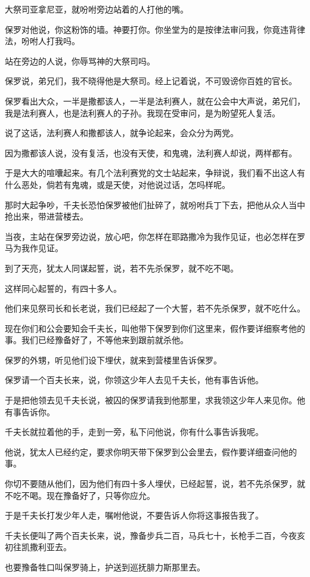\documentclass[12pt,oneside]{book}
\begin{document}
大祭司亚拿尼亚，就吩咐旁边站着的人打他的嘴。

保罗对他说，你这粉饰的墙。神要打你。你坐堂为的是按律法审问我，你竟违背律法，吩咐人打我吗。

站在旁边的人说，你辱骂神的大祭司吗。

保罗说，弟兄们，我不晓得他是大祭司。经上记着说，不可毁谤你百姓的官长。

保罗看出大众，一半是撒都该人，一半是法利赛人，就在公会中大声说，弟兄们，我是法利赛人，也是法利赛人的子孙。我现在受审问，是为盼望死人复活。

说了这话，法利赛人和撒都该人，就争论起来，会众分为两党。

因为撒都该人说，没有复活，也没有天使，和鬼魂，法利赛人却说，两样都有。

于是大大的喧囔起来。有几个法利赛党的文士站起来，争辩说，我们看不出这人有什么恶处，倘若有鬼魂，或是天使，对他说过话，怎吗样呢。

那时大起争吵，千夫长恐怕保罗被他们扯碎了，就吩咐兵丁下去，把他从众人当中抢出来，带进营楼去。

当夜，主站在保罗旁边说，放心吧，你怎样在耶路撒冷为我作见证，也必怎样在罗马为我作见证。

到了天亮，犹太人同谋起誓，说，若不先杀保罗，就不吃不喝。

这样同心起誓的，有四十多人。

他们来见祭司长和长老说，我们已经起了一个大誓，若不先杀保罗，就不吃什么。

现在你们和公会要知会千夫长，叫他带下保罗到你们这里来，假作要详细察考他的事。我们已经豫备好了，不等他来到跟前就杀他。

保罗的外甥，听见他们设下埋伏，就来到营楼里告诉保罗。

保罗请一个百夫长来，说，你领这少年人去见千夫长，他有事告诉他。

于是把他领去见千夫长说，被囚的保罗请我到他那里，求我领这少年人来见你。他有事告诉你。

千夫长就拉着他的手，走到一旁，私下问他说，你有什么事告诉我呢。

他说，犹太人已经约定，要求你明天带下保罗到公会里去，假作要详细查问他的事。

你切不要随从他们，因为他们有四十多人埋伏，已经起誓，说，若不先杀保罗，就不吃不喝。现在豫备好了，只等你应允。

于是千夫长打发少年人走，嘱咐他说，不要告诉人你将这事报告我了。

千夫长便叫了两个百夫长来，说，豫备步兵二百，马兵七十，长枪手二百，今夜亥初往凯撒利亚去。

也要豫备牲口叫保罗骑上，护送到巡抚腓力斯那里去。
\end{document}
